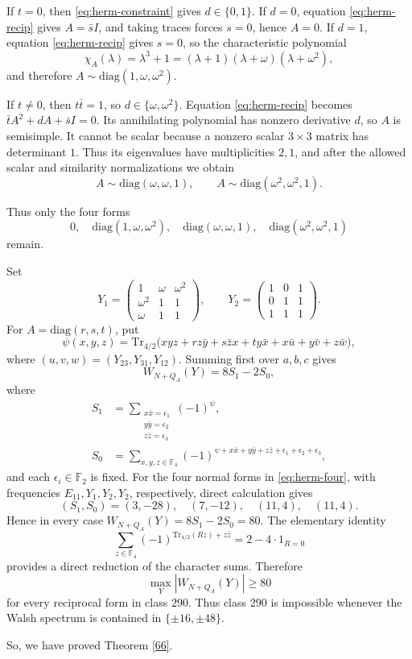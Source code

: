 \documentclass[11pt]{article}
\newtheorem{open problem}{Open problem}
\begin{document}
\begin{appendix}
If $t=0$, then \eqref{eq:herm-constraint} gives $d\in\{0,1\}$.
If $d=0$, equation \eqref{eq:herm-recip} gives $A=\bar sI$, and taking traces
forces $s=0$, hence $A=0$. If $d=1$, equation \eqref{eq:herm-recip} gives
$s=0$, so the characteristic polynomial
\[
\chi_A(\lambda)=\lambda^3+1=(\lambda+1)(\lambda+\omega)(\lambda+\omega^2),
\]
and therefore
$
A\sim \text{diag}(1,\omega,\omega^2).
$

If $t\ne0$, then $t\bar t=1$, so
$
d\in\{\omega,\omega^2\}.
$
Equation \eqref{eq:herm-recip} becomes
$
\bar t A^2+dA+\bar sI=0.
$
Its annihilating polynomial has nonzero derivative $d$, so $A$ is semisimple.
It cannot be scalar because a nonzero scalar $3\times3$ matrix has determinant $1$.
Thus its eigenvalues have multiplicities $2,1$, and after the allowed scalar and
similarity normalizations we obtain
\[
A\sim \text{diag}(\omega,\omega,1),
\qquad
A\sim \text{diag}(\omega^2,\omega^2,1).
\]

Thus only the four forms
\begin{equation}
0,
\quad
\text{diag}(1,\omega,\omega^2),
\quad
\text{diag}(\omega,\omega,1),
\quad
\text{diag}(\omega^2,\omega^2,1)
\label{eq:herm-four}
\end{equation}
remain.

Set
\[
Y_1=
\begin{pmatrix}
1&\omega&\omega^2\\
\omega^2&1&1\\
\omega&1&1
\end{pmatrix},
\qquad
Y_2=
\begin{pmatrix}
1&0&1\\
0&1&1\\
1&1&1
\end{pmatrix}.
\]
For $A=\text{diag}(r,s,t)$, put
\[
\psi(x,y,z)=
\text{Tr}_{4/2}\bigl(xyz+r z\bar y+s\bar z x+t y\bar x
+x\bar u+y\bar v+z\bar w\bigr),
\]
where $(u,v,w)=(Y_{23},Y_{31},Y_{12})$.
Summing first over $a,b,c$ gives
\begin{equation}
W_{N+Q_A}(Y)=8S_1-2S_0,
\label{eq:herm-char-sum}
\end{equation}
where
\begin{align}
S_1&=
\sum_{\substack{x\bar x=\epsilon_1\\y\bar y=\epsilon_2\\z\bar z=\epsilon_3}}
(-1)^\psi,\\
S_0&=
\sum_{x,y,z\in \mathbb{F}_4}
(-1)^{\psi+x\bar x+y\bar y+z\bar z+\epsilon_1+\epsilon_2+\epsilon_3},
\end{align}
and each $\epsilon_i\in \mathbb{F}_2$ is fixed. For the four normal forms in \eqref{eq:herm-four}, with frequencies
$E_{11},Y_1,Y_2,Y_2$, respectively, direct calculation gives
\[
(S_1,S_0)=(3,-28),\quad(7,-12),\quad(11,4),\quad(11,4).
\]
Hence in every case $W_{N+Q_A}(Y)=8S_1-2S_0=80$.
The elementary identity
\[
\sum_{z\in \mathbb{F}_4}
(-1)^{\text{Tr}_{4/2}(Rz)+z\bar z}
=2-4\cdot1_{R=0}
\]
provides a direct reduction of the character sums.
Therefore
\begin{equation}
\max_Y|W_{N+Q_A}(Y)|\ge80
\end{equation}
for every reciprocal form in class $290$.
Thus class $290$ is impossible whenever the Walsh spectrum is contained in
$\{\pm16,\pm48\}$.

So, we have proved Theorem \ref{66}.
\end{appendix}
\end{document}
